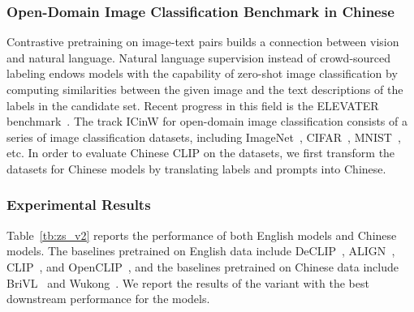 \subsubsection{Open-Domain Image Classification Benchmark in Chinese}
Contrastive pretraining on image-text pairs builds a connection between vision and natural language. Natural language supervision instead of crowd-sourced labeling endows models with the capability of zero-shot image classification by computing similarities between the given image and the text descriptions of the labels in the candidate set. 
Recent progress in this field is the ELEVATER benchmark~\citep{elevater}. 
The track ICinW for open-domain image classification consists of a series of image classification datasets, including ImageNet~\citep{imagenet}, CIFAR~\citep{cifar}, MNIST~\citep{mnist}, etc.
In order to evaluate Chinese CLIP on the datasets, we first transform the datasets for Chinese models by translating labels and prompts into Chinese. 

\subsubsection{Experimental Results}
Table~\ref{tb:zs_v2} reports the performance of both English models and Chinese models. 
The baselines pretrained on English data include DeCLIP~\citep{declip}, ALIGN~\citep{align}, CLIP~\citep{clip}, and OpenCLIP~\citep{openclip}, and the baselines pretrained on Chinese data include BriVL~\citep{wenlan} and Wukong~\citep{wukong}. 
We report the results of the variant with the best downstream performance for the models. 

